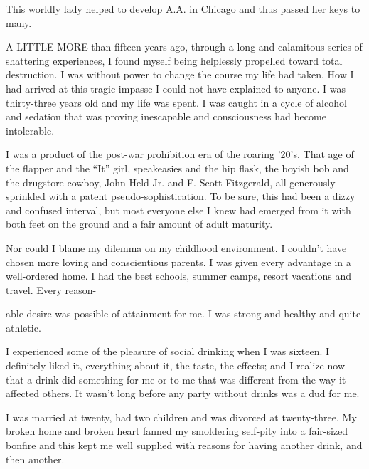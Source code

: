 

\bbChapterPreamble



\begin{biblechapter}
    This worldly lady helped to develop A.A. in Chicago
    and thus passed her keys to many.
\end{biblechapter}


\begin{biblechapter}
    A LITTLE MORE than fifteen years ago, 
    through a long and calamitous series of shattering experiences, 
    I found myself being helplessly propelled 
    toward total destruction.
\verse I was without power to change the course my life had taken.
\verse How I had arrived at this tragic impasse 
    I could not have explained to anyone.
\verse I was thirty-three years old and my life was spent.
\verse I was caught in a cycle of alcohol and sedation 
    that was proving inescapable and consciousness had become intolerable.

\verse I was a product of the post-war prohibition era of the roaring ’20’s. That age of the flapper and the “It” girl, speakeasies and the hip flask, the boyish bob and the drugstore cowboy, John Held Jr. and F. Scott Fitzgerald, all generously sprinkled with a patent pseudo-sophistication. To be sure, this had been a dizzy and confused interval, but most everyone else I knew had emerged from it with both feet on the ground and a fair amount of adult maturity.

Nor could I blame my dilemma on my childhood environment. I couldn’t have chosen more loving and conscientious parents. I was given every advantage in a well-ordered home. I had the best schools, summer camps, resort vacations and travel. Every reason-

able desire was possible of attainment for me. I was strong and healthy and quite athletic.

I experienced some of the pleasure of social drinking when I was sixteen. I definitely liked it, everything about it, the taste, the effects; and I realize now that a drink did something for me or to me that was different from the way it affected others. It wasn’t long before any party without drinks was a dud for me.

I was married at twenty, had two children and was divorced at twenty-three. My broken home and broken heart fanned my smoldering self-pity into a fair-sized bonfire and this kept me well supplied with reasons for having another drink, and then another.


\end{biblechapter}
